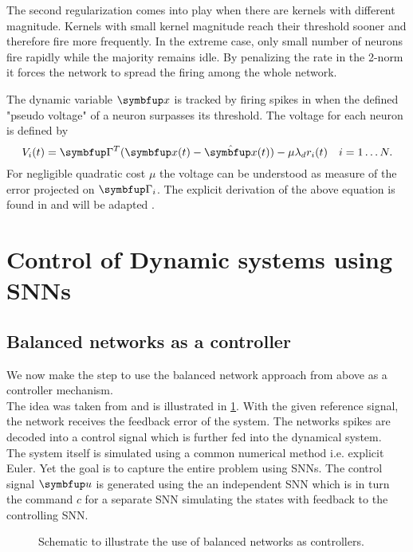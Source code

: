 The second regularization comes into play when there are kernels with different magnitude. Kernels with small kernel magnitude reach their threshold sooner and therefore fire more frequently. In the extreme case, only small number of neurons fire rapidly while the majority remains idle. By penalizing the rate in the 2-norm it forces the network to spread the firing among the whole network.\\


The dynamic variable $\bmu{x}$ is tracked by firing spikes in when the defined "pseudo voltage" of a neuron surpasses its threshold. The voltage for each neuron is defined by
\begin{equation}\label{eq:voltage}
V_i(t)=\bmu{\Gamma}^T(\bmu{x}(t)-\hat{\bmu{x}}(t))-\mu \lambda_d r_i(t)
\quad i  = 1\dots N.
\end{equation}
For negligible quadratic cost $\mu$ the voltage can be understood as measure of the error projected on $\bmu{\Gamma}_i$. The explicit derivation of the above equation is found in \cite{boerlin_predictive_2013} and will be adapted .
\section{Control of Dynamic systems using \acp{SNN}}\label{sec:control}
\subsection{Balanced networks as a controller}
We now make the step to use the balanced network approach from above as a controller mechanism.\\
The idea was taken from \cite{huang_optimizing_2017} and is illustrated in \cref{fig:schematic}. With the given reference signal, the network receives the feedback error of the system. The networks spikes are decoded into a control signal which is further fed into the dynamical system.\\
The system itself is simulated using a common numerical method i.e. explicit Euler. Yet the goal is to capture the entire problem using \acp{SNN}. The control signal $\bmu{u}$ is generated using the an independent \ac{SNN} which is in turn the command $c$ for a separate \ac{SNN} simulating the states with feedback to the controlling \ac{SNN}.
\begin{figure}
	\centering
	\caption{Schematic to illustrate the use of balanced networks as controllers.}
	\label{fig:schematic}
\end{figure}
